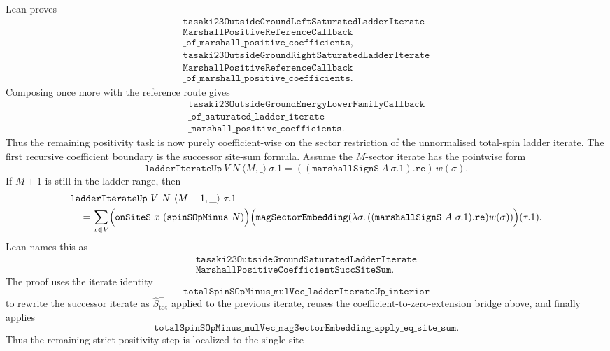 \documentclass[a4paper,11pt]{article}
\begin{document}
Lean proves
\[
\begin{gathered}
\texttt{tasaki23OutsideGroundLeftSaturatedLadderIterate}\\
\texttt{MarshallPositiveReferenceCallback}\\
\texttt{\_of\_marshall\_positive\_coefficients},\\
\texttt{tasaki23OutsideGroundRightSaturatedLadderIterate}\\
\texttt{MarshallPositiveReferenceCallback}\\
\texttt{\_of\_marshall\_positive\_coefficients}.
\end{gathered}
\]
Composing once more with the reference route gives
\[
\begin{gathered}
\texttt{tasaki23OutsideGroundEnergyLowerFamilyCallback}\\
\texttt{\_of\_saturated\_ladder\_iterate}\\
\texttt{\_marshall\_positive\_coefficients}.
\end{gathered}
\]
Thus the remaining positivity task is now purely coefficient-wise on the
sector restriction of the unnormalised total-spin ladder iterate.
The first recursive coefficient boundary is the successor site-sum formula.
Assume the \(M\)-sector iterate has the pointwise form
\[
\texttt{ladderIterateUp}\ V\ N\ \langle M,\_\rangle\ \sigma.1
=
((\texttt{marshallSignS}\ A\ \sigma.1).\texttt{re})\,w(\sigma).
\]
If \(M+1\) is still in the ladder range, then
\[
\begin{aligned}
&\texttt{ladderIterateUp}\ V\ N\ \langle M+1,\_\rangle\ \tau.1 \\
&\quad =
\sum_{x\in V}
\Bigl(
\texttt{onSiteS}\ x\ (\texttt{spinSOpMinus}\ N)
\Bigr)
\Bigl(
\texttt{magSectorEmbedding}
  (\lambda \sigma.\,
   ((\texttt{marshallSignS}\ A\ \sigma.1).\texttt{re})w(\sigma))
\Bigr)(\tau.1).
\end{aligned}
\]
Lean names this as
\[
\begin{gathered}
\texttt{tasaki23OutsideGroundSaturatedLadderIterate}\\
\texttt{MarshallPositiveCoefficientSuccSiteSum}.
\end{gathered}
\]
The proof uses the iterate identity
\[
\texttt{totalSpinSOpMinus\_mulVec\_ladderIterateUp\_interior}
\]
to rewrite the successor iterate as \( \hat S^-_{\mathrm{tot}}\) applied to
the previous iterate, reuses the coefficient-to-zero-extension bridge above,
and finally applies
\[
\texttt{totalSpinSOpMinus\_mulVec\_magSectorEmbedding\_apply\_eq\_site\_sum}.
\]
Thus the remaining strict-positivity step is localized to the single-site
\end{document}
